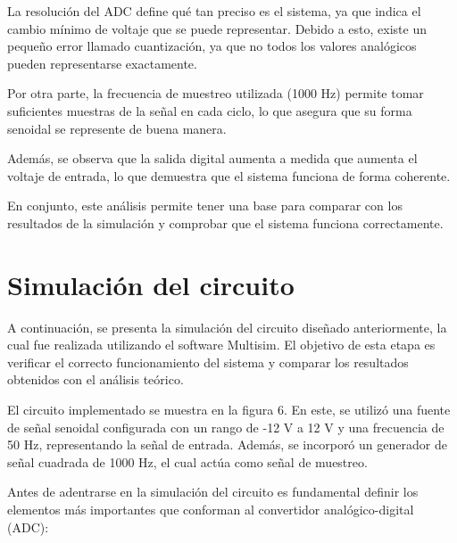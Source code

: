 \documentclass[12pt, a4paper]{article}
\begin{document}
    La resolución del ADC define qué tan preciso es el sistema, ya que indica el cambio mínimo de voltaje que se puede representar. Debido a esto, existe un pequeño error llamado cuantización, ya que no todos los valores analógicos pueden representarse exactamente.

    Por otra parte, la frecuencia de muestreo utilizada (1000 Hz) permite tomar suficientes muestras de la señal en cada ciclo, lo que asegura que su forma senoidal se represente de buena manera.

    Además, se observa que la salida digital aumenta a medida que aumenta el voltaje de entrada, lo que demuestra que el sistema funciona de forma coherente.

    En conjunto, este análisis permite tener una base para comparar con los resultados de la simulación y comprobar que el sistema funciona correctamente.

    \newpage

    \section{Simulación del circuito}

    A continuación, se presenta la simulación del circuito diseñado anteriormente, la cual fue realizada utilizando el software Multisim. El objetivo de esta etapa es verificar el correcto funcionamiento del sistema y comparar los resultados obtenidos con el análisis teórico.

    El circuito implementado se muestra en la figura 6. En este, se utilizó una fuente de señal senoidal configurada con un rango de -12 V a 12 V y una frecuencia de 50 Hz, representando la señal de entrada. Además, se incorporó un generador de señal cuadrada de 1000 Hz, el cual actúa como señal de muestreo.

    Antes de adentrarse en la simulación del circuito es fundamental definir los elementos más importantes que conforman al convertidor analógico-digital (ADC):
\end{document}
